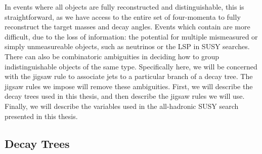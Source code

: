 In events where all objects are fully reconstructed and distinguishable, this is straightforward, as we have access to the entire set of four-momenta to fully reconstruct the target masses and decay angles.
Events which contain \met are more difficult, due to the loss of information: the potential for multiple mismeasured or simply unmeasureable objects, such as neutrinos or the LSP in SUSY searches.
There can also be combinatoric ambiguities in deciding how to group indistinguishable objects of the same type.
Specifically here, we will be concerned with the jigsaw rule to associate jets to a particular branch of a decay tree.
The jigsaw rules we impose will remove these ambiguities.
First, we will describe the decay trees used in this thesis, and then describe the jigsaw rules we will use.
Finally, we will describe the variables used in the all-hadronic SUSY search presented in this thesis.

\subsection{Decay Trees}

